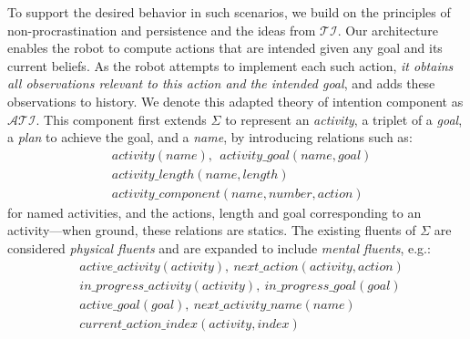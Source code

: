 \documentclass[letterpaper, 10 pt, conference]{ieeeconf}  %
\newcommand{\stt}[1]{{\small\texttt{#1}}}
\begin{document}
\begin{itemize}
\end{itemize}
To support the desired behavior in such scenarios, we build on the
principles of non-procrastination and persistence and the ideas from
$\mathcal{TI}$. Our architecture enables the robot to compute actions
that are intended given any goal and its current beliefs. As the robot
attempts to implement each such action, \emph{it obtains all
  observations relevant to this action and the intended goal}, and
adds these observations to history. We denote this adapted theory of
intention component as $\mathcal{ATI}$. This component first extends
$\Sigma$ to represent an \emph{activity}, a triplet of a \emph{goal},
a \emph{plan} to achieve the goal, and a \emph{name}, by introducing
relations such as:
\begin{align*}
  &activity(name),~~activity\_goal(name, goal)\\
  &activity\_length(name, length)\\
  &activity\_component(name, number, action)
\end{align*}
for named activities, and the actions, length and goal corresponding
to an activity---when ground, these relations are statics. The
existing fluents of $\Sigma$ are considered \emph{physical fluents}
and are expanded to include \emph{mental fluents}, e.g.:
\begin{align*}
  &active\_activity(activity),~next\_action(activity, action)\\
  &in\_progress\_activity(activity),~in\_progress\_goal(goal)\\
  &active\_goal(goal),~next\_activity\_name(name)\\
  &current\_action\_index(activity, index)
\end{align*}
\end{document}
